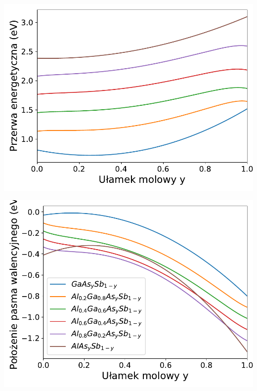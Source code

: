 \documentclass[12pt,openany,a4paper]{book}
\begin{document}
\begin{minipage}[t]{0.5\textwidth}
	\includegraphics[width = \linewidth]{Figures/quaternary/quat_eg_x.pdf}\label{fig:quat_Eg_x}
\end{minipage}
\begin{minipage}[t]{0.5\textwidth}
	\includegraphics[width = \linewidth]{Figures/quaternary/quat_vbo_x.pdf}\label{fig:quat_vbo_x}
\end{minipage}
\end{document}
